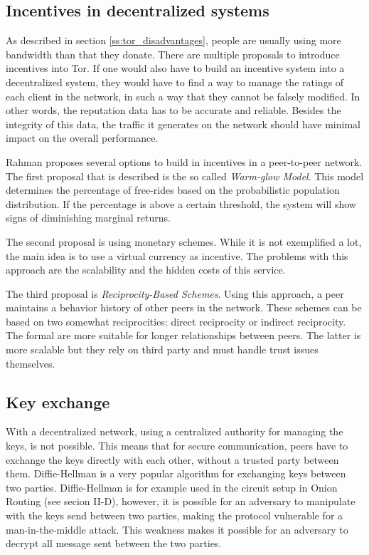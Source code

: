 \documentclass{article}
\begin{document}
	\subsection{Incentives in decentralized systems}
		As described in section \ref{ss:tor_disadvantages}, people are usually using more bandwidth than that they donate. There are multiple proposals \cite{dingledine2010building, jansen13lira} to introduce incentives into Tor. If one would also have to build an incentive system into a decentralized system, they would have to find a way to manage the ratings of each client in the network, in such a way that they cannot be falsely modified. In other words, the reputation data has to be accurate and reliable. Besides the integrity of this data, the traffic it generates on the network should have minimal impact on the overall performance.
		
		Rahman \cite{rahman2009survey} proposes several options to build in incentives in a peer-to-peer network. The first proposal that is described is the so called \emph{Warm-glow Model}. This model determines the percentage of free-rides based on the probabilistic population distribution. If the percentage is above a certain threshold, the system will show signs of diminishing marginal returns.
		
		The second proposal is using monetary schemes. While it is not exemplified a lot, the main idea is to use a virtual currency as incentive. The problems with this approach are the scalability and the hidden costs of this service.
		
		The third proposal is \emph{Reciprocity-Based Schemes}. Using this approach, a peer maintains a behavior history of other peers in the network. These schemes can be based on two somewhat reciprocities: direct reciprocity or indirect reciprocity. The formal are more suitable for longer relationships between peers. The latter is more scalable but they rely on third party and must handle trust issues themselves.

	\subsection{Key exchange}
		With a decentralized network, using a centralized authority for managing the keys, is not possible. This means that for secure communication, peers have to exchange the keys directly with each other, without a trusted party between them. Diffie-Hellman is a very popular algorithm for exchanging keys between two parties. Diffie-Hellman is for example used in the circuit setup in Onion Routing (see secion II-D), however, it is possible for an adversary to manipulate with the keys send between two parties, making the protocol vulnerable for a man-in-the-middle attack. This weakness makes it possible for an adversary to decrypt all message sent between the two parties.
\end{document}
